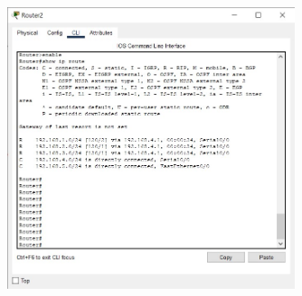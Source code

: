 \documentclass{article}
\begin{document}
\begin{figure}[H]
    \centering
    \includegraphics[width=0.75\textwidth]{figures/7.jpg}
    \caption{}
    \label{fig:fig1}
\end{figure}
\end{document}
